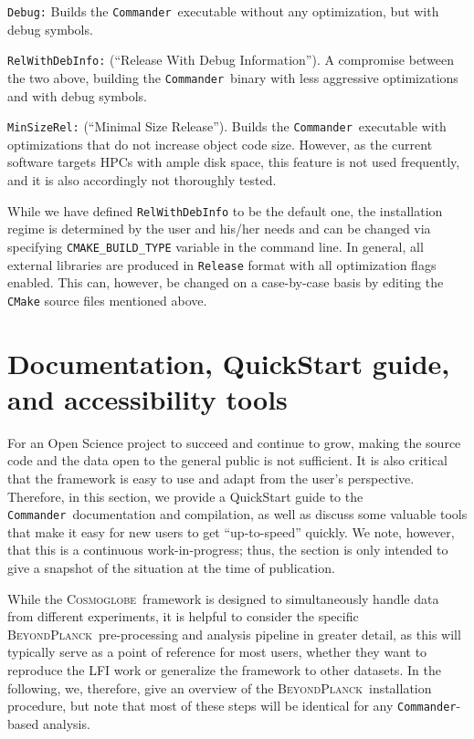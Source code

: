 \documentclass[twocolumn]{openjournal}
\def\commander{\texttt{Commander}}
\newcommand{\BP}{\textsc{BeyondPlanck}}
\newcommand{\cosmoglobe}{\textsc{Cosmoglobe}}
\begin{document}
\texttt{Debug:} Builds the \commander\ executable without any optimization, but
with debug symbols.

\texttt{RelWithDebInfo:} (``Release With Debug Information''). A compromise
between the two above, building the \commander\ binary with less aggressive
optimizations and with debug symbols.

\texttt{MinSizeRel:} (``Minimal Size Release''). Builds the \commander\
executable with optimizations that do not increase object code size. However,
as the current software targets HPCs with ample disk space, this feature is not
used frequently, and it is also accordingly not thoroughly tested.

While we have defined \texttt{RelWithDebInfo} to be the default one, the
installation regime is determined by the user and his/her needs and can be
changed via specifying \texttt{CMAKE\_BUILD\_TYPE} variable in the command
line. In general, all external libraries are produced in  \texttt{Release}
format with all optimization flags enabled. This can, however, be changed on a
case-by-case basis by editing the \texttt{CMake}  source files mentioned above.


\section{Documentation, QuickStart guide, and accessibility tools}
\label{sec:bp_reproducibility}

For an Open Science project to succeed and continue to grow, making the source
code and the data open to the general public is not sufficient. It is also
critical that the framework is easy to use and adapt from the user’s
perspective. Therefore, in this section, we provide a QuickStart guide to the
\commander\ documentation and compilation, as well as discuss some valuable
tools that make it easy for new users to get “up-to-speed” quickly. We note,
however, that this is a continuous work-in-progress; thus, the section is only
intended to give a snapshot of the situation at the time of publication.

While the \cosmoglobe\ framework is designed to simultaneously handle data from
different experiments, it is helpful to consider the specific \BP\
pre-processing and analysis pipeline in greater detail, as this will typically
serve as a point of reference for most users, whether they want to reproduce
the LFI work or generalize the framework to other datasets. In the following,
we, therefore, give an overview of the \BP\ installation procedure, but note
that most of these steps will be identical for any \commander-based analysis.
\end{document}

